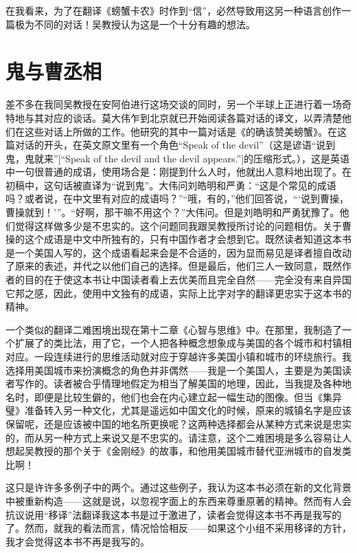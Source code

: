 在我看来，为了在翻译《螃蟹卡农》时作到“信”，必然导致用这另一种语言创作一篇极为不同的对话！吴教授认为这是一个十分有趣的想法。

\section*{鬼与曹丞相}

差不多在我同吴教授在安阿伯进行这场交谈的同时，另一个半球上正进行着一场奇特地与其对应的谈话。莫大伟乍到北京就已开始阅读各篇对话的译文，以弄清楚他们在这些对话上所做的工作。他研究的其中一篇对话是《的确该赞美螃蟹》。在这篇对话的开头，在英文原文里有一个角色“Speak of the devil”（这是谚语“说到鬼，鬼就来”[“Speak of the devil and the devil appears.”]的压缩形式。），这是英语中一句很普通的成语，使用场合是：刚提到什么人时，他就出人意料地出现了。在初稿中，这句话被直译为“说到鬼”。大伟问刘皓明和严勇：“这是个常见的成语吗？或者说，在中文里有对应的成语吗？”“哦，有的，”他们回答说，“‘说到曹操，曹操就到！’”。“好啊，那干嘛不用这个？”大伟问。但是刘皓明和严勇犹豫了。他们觉得这样做多少是不忠实的。这个问题同我跟吴教授所讨论的问题相仿。关于曹操的这个成语是中文中所独有的，只有中国作者才会想到它。既然读者知道这本书是一个美国人写的，这个成语看起来会是不合适的，因为显而易见是译者擅自改动了原来的表述，并代之以他们自己的选择。但是最后，他们三人一致同意，既然作者的目的在于使这本书让中国读者看上去优美而且完全自然——完全没有来自异国它邦之感，因此，使用中文独有的成语，实际上比字对字的翻译更忠实于这本书的精神。

一个类似的翻译二难困境出现在第十二章《心智与思维》中。在那里，我制造了一个扩展了的类比法，用了它，一个人把各种概念想象成与美国的各个城市和村镇相对应。一段连续进行的思维活动就对应于穿越许多美国小镇和城市的环绕旅行。我选择用美国城市来扮演概念的角色并非偶然——我是一个美国人，主要是为美国读者写作的。读者被合乎情理地假定为相当了解美国的地理，因此，当我提及各种地名时，即便是比较生僻的，他们也会在内心建立起一幅生动的图像。但当《集异璧》准备转入另一种文化，尤其是遥远如中国文化的时候，原来的城镇名字是应该保留呢，还是应该被中国的地名所更换呢？这两种选择都会从某种方式来说是忠实的，而从另一种方式上来说又是不忠实的。请注意，这个二难困境是多么容易让人想起吴教授的那个关于《金刚经》的故事，和他用美国城市替代亚洲城市的自发类比啊！

这只是许许多多例子中的两个。通过这些例子，我认为这本书必须在新的文化背景中被重新构造——这就是说，以忽视字面上的东西来尊重原著的精神。然而有人会抗议说用“移译”法翻译我这本书是过于激进了，读者会觉得这本书不再是我写的了。然而，就我的看法而言，情况恰恰相反——如果这个小组不采用移译的方针，我才会觉得这本书不再是我写的。


